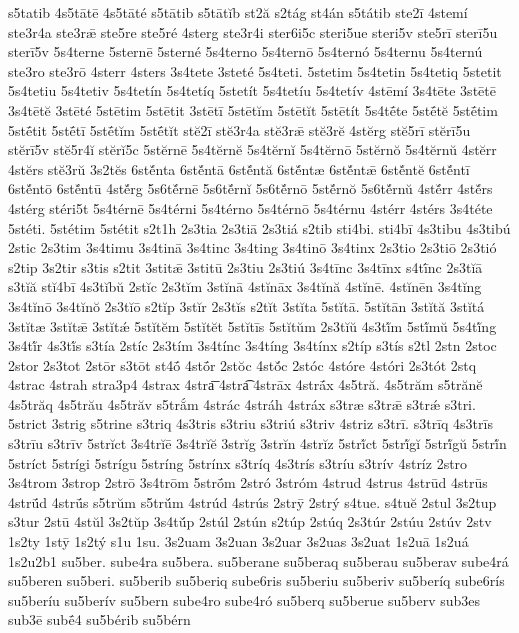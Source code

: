 {s5tatib
4s5tātē
4s5tāté
s5tātib
s5tātĭb
st2ă
s2tág
st4án
s5tátib
ste2ī
4stemí
ste3r4a
ste3rǣ
ste5re
ste5ré
4sterg
ste3r4i
ster6i5c
steri5ue
steri5v
ste5rī
sterī5u
sterī5v
5s4terne
5sternē
5sterné
5s4terno
5s4ternō
5s4ternó
5s4ternu
5s4ternú
ste3ro
ste3rō
4sterr
4sters
3s4tete
3steté
5s4teti.
5stetim
5s4tetin
5s4tetiq
5stetit
5s4tetiu
5s4tetiv
5s4tetín
5s4tetíq
5stetít
5s4tetíu
5s4tetív
4stēmí
3s4tēte
3stētē
3s4tētĕ
3stēté
5stētim
5stētit
3stētī
5stētĭm
5stētĭt
5stētít
5s4tḗte
5stḗtĕ
5stḗtim
5stḗtit
5stḗtī
5stḗtĭm
5stḗtĭt
stĕ2ī
stĕ3r4a
stĕ3rǣ
stĕ3rĕ
4stĕrg
stĕ5rī
stĕrī5u
stĕrī5v
stĕ5r4ĭ
stĕrĭ5c
5stĕrnē
5s4tĕrnĕ
5s4tĕrnĭ
5s4tĕrnō
5stĕrnŏ
5s4tĕrnŭ
4stĕrr
4stĕrs
stĕ3rŭ
3s2tĕs
6stĕ́nta
6stĕ́ntā
6stĕ́ntă
6stĕ́ntæ
6stĕ́ntǣ
6stĕ́ntĕ
6stĕ́ntī
6stĕ́ntō
6stĕ́ntū
4stĕ́rg
5s6tĕ́rnē
5s6tĕ́rnĭ
5s6tĕ́rnō
5stĕ́rnŏ
5s6tĕ́rnŭ
4stĕ́rr
4stĕ́rs
4stérg
stéri5t
5s4térnē
5s4térni
5s4térno
5s4térnō
5s4térnu
4stérr
4stérs
3s4téte
5stéti.
5stétim
5stétit
s2t1h
2s3tia
2s3tiā
2s3tiá
s2tib
sti4bi.
sti4bī
4s3tibu
4s3tibú
2stic
2s3tim
3s4timu
3s4tinā
3s4tinc
3s4ting
3s4tinō
3s4tinx
2s3tio
2s3tiō
2s3tió
s2tip
3s2tir
s3tis
s2tit
3stitǣ
3stitū
2s3tiu
2s3tiú
3s4tīnc
3s4tīnx
s4tī́nc
2s3tĭā
s3tĭă
stĭ4bī
4s3tĭbŭ
2stĭc
2s3tĭm
3stĭnā
4stĭnāx
3s4tĭnă
4stĭnē.
4stĭnēn
3s4tĭng
3s4tĭnō
3s4tĭnŏ
2s3tĭō
s2tĭp
3stĭr
2s3tĭs
s2tĭt
3stĭta
5stĭtā.
5stĭtān
3stĭtă
3stĭtá
3stĭtæ
3stĭtǣ
3stĭtǽ
5stĭtĕm
5stĭtĕt
5stĭtīs
5stĭtŭm
2s3tĭŭ
4s3tĭ́m
5stĭ́mŭ
5s4tĭ́ng
3s4tĭ́r
4s3tĭ́s
s3tía
2stíc
2s3tím
3s4tínc
3s4tíng
3s4tínx
s2típ
s3tís
s2tl
2stn
2stoc
2stor
2s3tot
2stōr
s3tōt
st4ṓ
4stṓr
2stŏc
4stŏ́c
2stóc
4stóre
4stóri
2s3tót
2stq
4strac
4strah
stra3p4
4strax
4stra͞
4stra͡
4strāx
4strā́x
4s5tră.
4s5trăm
s5trănĕ
4s5trăq
4s5trău
4s5trăv
s5trắm
4strác
4stráh
4stráx
s3træ
s3trǣ
s3trǽ
s3tri.
5strict
3strig
s5trine
s3triq
4s3tris
s3triu
s3triú
s3triv
4striz
s3trī.
s3trīq
4s3trīs
s3trīu
s3trīv
5strĭct
3s4trĭē
3s4trĭĕ
3strĭg
3strĭn
4strĭz
5strĭ́ct
5strĭ́gĭ
5strĭ́gŭ
5strĭ́n
5stríct
5strígi
5strígu
5stríng
5strínx
s3tríq
4s3trís
s3tríu
s3trív
4stríz
2stro
3s4trom
3strop
2strō
3s4trōm
5strṓm
2stró
3stróm
4strud
4strus
4strūd
4strūs
4strū́d
4strū́s
s5trŭm
s5trŭ́m
4strúd
4strús
2strȳ
2strý
s4tue.
s4tuĕ
2stul
3s2tup
s3tur
2stū
4stŭl
3s2tŭp
3s4tŭ́p
2stúl
2stún
s2túp
2stúq
2s3túr
2stúu
2stúv
2stv
1s2ty
1stȳ
1s2tý
s1u
1su.
3s2uam
3s2uan
3s2uar
3s2uas
3s2uat
1s2uā
1s2uá
1s2u2b1
su5ber.
sube4ra
su5bera.
su5berane
su5beraq
su5berau
su5berav
sube4rá
su5beren
su5beri.
su5berib
su5beriq
sube6ris
su5beriu
su5beriv
su5beríq
sube6rís
su5beríu
su5berív
su5bern
sube4ro
sube4ró
su5berq
su5berue
su5berv
sub3es
sub3ē
subḗ4
su5bérib
su5bérn
}
